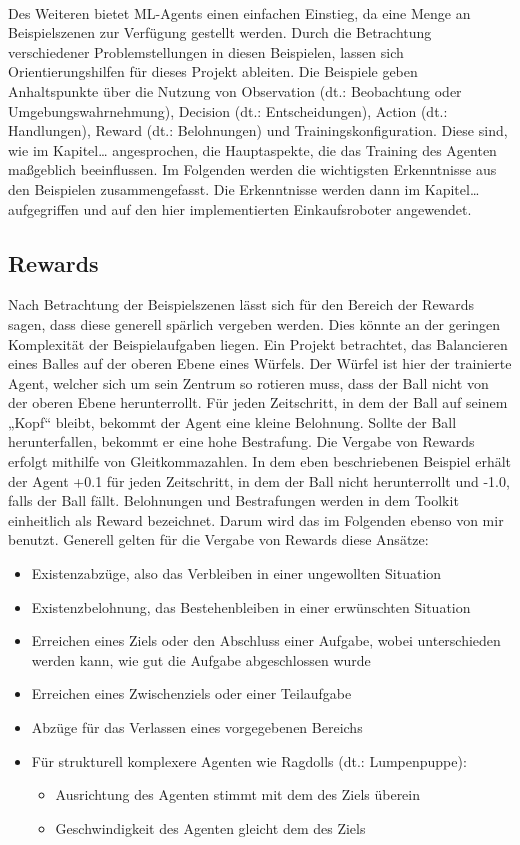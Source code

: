 \\
Des Weiteren bietet ML-Agents einen einfachen Einstieg, da eine Menge an Beispielszenen zur Verfügung gestellt werden. Durch die Betrachtung verschiedener Problemstellungen in diesen Beispielen, lassen sich Orientierungshilfen für dieses Projekt ableiten. Die Beispiele geben Anhaltspunkte über die Nutzung von Observation (dt.: Beobachtung oder Umgebungswahrnehmung), Decision (dt.: Entscheidungen), Action (dt.: Handlungen), Reward (dt.: Belohnungen) und Trainingskonfiguration. Diese sind, wie im Kapitel… angesprochen, die Hauptaspekte, die das Training des Agenten maßgeblich beeinflussen. Im Folgenden werden die wichtigsten Erkenntnisse aus den Beispielen zusammengefasst. Die Erkenntnisse werden dann im Kapitel… aufgegriffen und auf den hier implementierten Einkaufsroboter angewendet. 

\subsection{Rewards}
\label{rewards}
Nach Betrachtung der Beispielszenen lässt sich für den Bereich der Rewards sagen, dass diese generell spärlich vergeben werden. Dies könnte an der geringen Komplexität der Beispielaufgaben liegen. Ein Projekt betrachtet, das Balancieren eines Balles auf der oberen Ebene eines Würfels. Der Würfel ist hier der trainierte Agent, welcher sich um sein Zentrum so rotieren muss, dass der Ball nicht von der oberen Ebene herunterrollt. Für jeden Zeitschritt, in dem der Ball auf seinem „Kopf“ bleibt, bekommt der Agent eine kleine Belohnung. Sollte der Ball herunterfallen, bekommt er eine hohe Bestrafung. Die Vergabe von Rewards erfolgt mithilfe von Gleitkommazahlen. In dem eben beschriebenen Beispiel erhält der Agent +0.1 für jeden Zeitschritt, in dem der Ball nicht herunterrollt und -1.0, falls der Ball fällt. Belohnungen und Bestrafungen werden in dem Toolkit einheitlich als Reward bezeichnet. Darum wird das im Folgenden ebenso von mir benutzt. Generell gelten für die Vergabe von Rewards diese Ansätze:
\\
\begin{itemize}
	\item Existenzabzüge, also das Verbleiben in einer ungewollten Situation 
	\item Existenzbelohnung, das Bestehenbleiben in einer erwünschten Situation
	\item Erreichen eines Ziels oder den Abschluss einer Aufgabe, wobei unterschieden werden kann, wie gut die Aufgabe abgeschlossen wurde
	\item Erreichen eines Zwischenziels oder einer Teilaufgabe
	\item Abzüge für das Verlassen eines vorgegebenen Bereichs
	\item Für strukturell komplexere Agenten wie Ragdolls (dt.: Lumpenpuppe):
	\begin{itemize}
		\item Ausrichtung des Agenten stimmt mit dem des Ziels überein
		\item Geschwindigkeit des Agenten gleicht dem des Ziels
	\end{itemize} 	 
\end{itemize}

